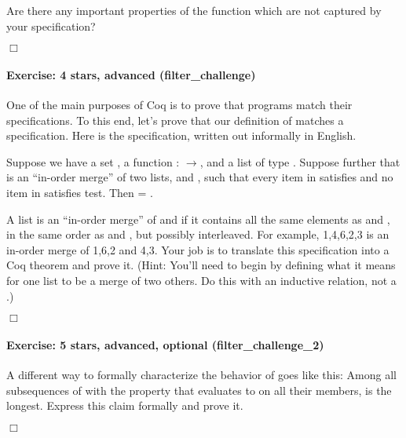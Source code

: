 \documentclass[12pt]{report}
\begin{document}
    Are there any important properties of the function  which
    are not captured by your specification? \begin{coqdoccode}
\coqdocemptyline
\end{coqdoccode}
\ensuremath{\Box} 

\paragraph{Exercise: 4 stars, advanced (filter\_challenge)}

 One of the main purposes of Coq is to prove that programs match
    their specifications.  To this end, let's prove that our
    definition of  matches a specification.  Here is the
    specification, written out informally in English.


    Suppose we have a set , a function : \ensuremath{\rightarrow}, and a list
     of type  .  Suppose further that  is an ``in-order
    merge'' of two lists,  and , such that every item in 
    satisfies  and no item in  satisfies test.  Then 
      = .


    A list  is an ``in-order merge'' of  and  if it contains
    all the same elements as  and , in the same order as 
    and , but possibly interleaved.  For example, 
    1,4,6,2,3
    is an in-order merge of
    1,6,2
    and
    4,3.
    Your job is to translate this specification into a Coq theorem and
    prove it.  (Hint: You'll need to begin by defining what it means
    for one list to be a merge of two others.  Do this with an
    inductive relation, not a .)  \begin{coqdoccode}
\coqdocemptyline
\end{coqdoccode}
\ensuremath{\Box} 

\paragraph{Exercise: 5 stars, advanced, optional (filter\_challenge\_2)}

 A different way to formally characterize the behavior of 
    goes like this: Among all subsequences of  with the property
    that  evaluates to  on all their members,  
     is the longest.  Express this claim formally and prove it. \begin{coqdoccode}
\coqdocemptyline
\end{coqdoccode}
\ensuremath{\Box} 
\end{document}
